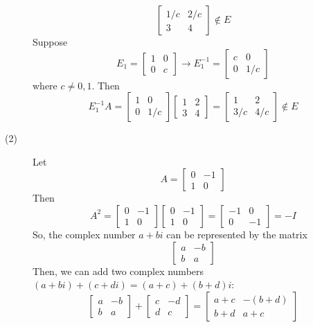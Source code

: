 \documentclass[openany]{book}
\begin{document}
\begin{description}
$$\begin{bmatrix}
1/c & 2/c \\
3 & 4
\end{bmatrix} \not \in E$$
Suppose
$$E_1 = \begin{bmatrix}
1 & 0 \\
0 & c
\end{bmatrix} \rightarrow E_1^{-1} = \begin{bmatrix}
c & 0 \\
0 & 1/c
\end{bmatrix}$$
where $c \neq 0, 1$. Then
$$E_1^{-1}A = \begin{bmatrix}
1 & 0 \\
0 & 1/c
\end{bmatrix}\begin{bmatrix}
1 & 2 \\
3 & 4
\end{bmatrix} = \begin{bmatrix}
1 & 2 \\
3/c & 4/c
\end{bmatrix} \not \in E$$
\item[(2)]
Let
$$A = \begin{bmatrix}
0 & -1 \\
1 & 0
\end{bmatrix}$$
Then
$$A^2 = \begin{bmatrix}
0 & -1 \\
1 & 0
\end{bmatrix}\begin{bmatrix}
0 & -1 \\
1 & 0
\end{bmatrix} = \begin{bmatrix}
-1 & 0 \\
0 & -1
\end{bmatrix} = -I$$
So, the complex number $a + bi$ can be represented by the matrix
$$\begin{bmatrix}
a & -b \\
b & a
\end{bmatrix}$$
Then, we can add two complex numbers $(a + bi) + (c + di) = (a + c) + (b + d)i$:
$$\begin{bmatrix}
a & -b \\
b & a
\end{bmatrix} + \begin{bmatrix}
c & -d \\
d & c
\end{bmatrix} = \begin{bmatrix}
a + c & -(b + d) \\
b + d & a + c
\end{bmatrix}$$

\end{description}
\end{document}
